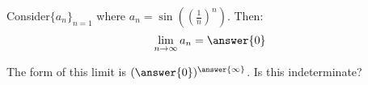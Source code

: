 \documentclass{ximera}
\author{Jim Talamo}
\begin{document}
\begin{exercise}


Consider$\{a_n \}_{n=1}$ where $a_n = \sin(\left(\frac{1}{n}\right)^{n})$.  Then:
\[
\lim_{n \to \infty} a_n = \answer{0}
\]

\begin{hint}
The form of this limit is $(\answer{0})^{\answer{\infty}}$.  Is this indeterminate?
\end{hint}
\end{exercise}
\end{document}
